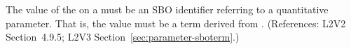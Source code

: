 The value of the   on a \Parameter must be an SBO
identifier referring to a quantitative parameter.  That is, the value must
be a term derived from \sboparameter.  (References: L2V2 Section~4.9.5; L2V3
Section~\ref{sec:parameter-sboterm}.)
